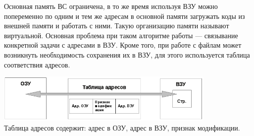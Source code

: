 \documentclass[unicode, 12pt, a4paper, oneside]{article}
\begin{document}
Основная память ВС ограничена, в то же время используя ВЗУ можно попеременно по одним и тем же адресам в основной памяти загружать коды из внешней памяти и работать с ними. Такую организацию памяти называют виртуальной. Основная проблема при таком алгоритме работы — связывание конкретной задачи с адресами в ВЗУ. Кроме того, при работе с файлам может возникнуть необходимость сохранения их в ВЗУ, для этого используется таблица соответствия адресов.

\begin{center} %
\includegraphics[width=0.8\textwidth]{virt_mem.png}\\
Таблица адресов содержит: адрес в ОЗУ, адрес в ВЗУ, признак модификации.
\end{center}
\end{document}
